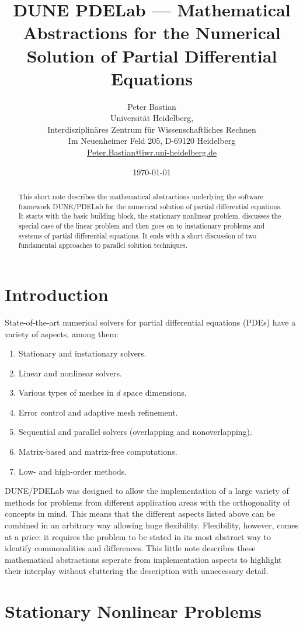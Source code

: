 \documentclass[a4paper,12pt]{article}
\title{DUNE PDELab ---
Mathematical Abstractions for the Numerical Solution of Partial Differential Equations}
\author{Peter Bastian\\
  Universität Heidelberg, \\
  Interdisziplinäres Zentrum für Wissenschaftliches Rechnen\\
  Im Neuenheimer Feld 205, D-69120 Heidelberg\\
  \url{Peter.Bastian@iwr.uni-heidelberg.de}
}
\date{\today}
\theoremstyle{definition}
\begin{document}
\maketitle

\begin{abstract}
This short note describes the mathematical abstractions underlying the
software framework DUNE/PDELab for the numerical solution of partial
differential equations. It starts with the basic building block, the
stationary nonlinear problem, discusses the special case of the linear
problem and then goes on to instationary problems and systems of partial
differential equations. It ends with a short discussion of two fundamental
approaches to parallel solution techniques.
\end{abstract}

\section{Introduction}

State-of-the-art numerical solvers for partial differential equations (PDEs)
have a variety of aspects, among them:
\begin{enumerate}[1)]
\item Stationary and instationary solvers.
\item Linear and nonlinear solvers.
\item Various types of meshes in $d$ space dimensions.
\item Error control and adaptive mesh refinement.
\item Sequential and parallel solvers (overlapping and nonoverlapping).
\item Matrix-based and matrix-free computations.
\item Low- and high-order methods.
\end{enumerate}
DUNE/PDELab was designed to allow the implementation of a large variety
of methods for problems from different application areas with the orthogonality
of concepts in mind. This means that the different aspects listed above
can be combined in an arbitrary way allowing huge flexibility.
Flexibility, however, comes at a price: it requires the problem to
be stated in its most abstract way to identify commonalities and differences.
This little note describes
these mathematical abstractions seperate from implementation
aspects to highlight their interplay without cluttering the description
with unnecessary detail.

\section{Stationary Nonlinear Problems}\label{Sec:BasicBuildingBlock}
\end{document}
